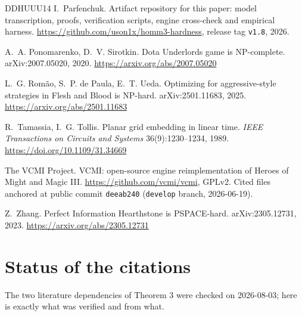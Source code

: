 \documentclass[11pt,a4paper]{article}
\theoremstyle{plain}
\theoremstyle{definition}
\theoremstyle{plain}
\theoremstyle{definition}
\theoremstyle{remark}
\newcommand{\src}[1]{\texttt{#1}}
\begin{document}
\begin{thebibliography}{DDHUUU14}
 I.~Parfenchuk. Artifact repository for this paper: model
transcription, proofs, verification scripts, engine cross-check and empirical harness.
\url{https://github.com/uson1x/homm3-hardness}, release tag \src{v1.8}, 2026.

 A.~A. Ponomarenko, D.~V. Sirotkin. Dota Underlords game is NP-complete.
arXiv:2007.05020, 2020. \url{https://arxiv.org/abs/2007.05020}

 L.~G. Rom\~ao, S.~P. de Paula, E.~T. Ueda. Optimizing for
aggressive-style strategies in Flesh and Blood is NP-hard. arXiv:2501.11683, 2025.
\url{https://arxiv.org/abs/2501.11683}

 R.~Tamassia, I.~G. Tollis. Planar grid embedding in linear time.
\emph{IEEE Transactions on Circuits and Systems} 36(9):1230--1234, 1989.
\url{https://doi.org/10.1109/31.34669}

 The VCMI Project. VCMI: open-source engine reimplementation of
Heroes of Might and Magic III. \url{https://github.com/vcmi/vcmi}, GPLv2. Cited files
anchored at public commit \src{deeab240} (\src{develop} branch, 2026-06-19).

 Z.~Zhang. Perfect Information Hearthstone is PSPACE-hard.
arXiv:2305.12731, 2023. \url{https://arxiv.org/abs/2305.12731}

\end{thebibliography}

\appendix

\section{Status of the citations}\label{app:citations}

The two literature dependencies of Theorem 3 were checked on 2026-08-03; here is exactly what
was verified and from what.
\end{document}
